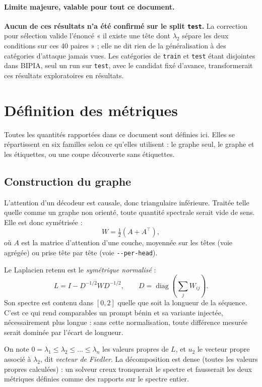 \documentclass[11pt,a4paper]{article}
\begin{document}
\paragraph{Limite majeure, valable pour tout ce document.} \textbf{Aucun de ces
résultats n'a été confirmé sur le split \texttt{test}.} La correction pour
sélection valide l'énoncé « il existe une tête dont $\lambda_2$ sépare les deux
conditions sur ces 40 paires » ; elle ne dit rien de la généralisation à des
catégories d'attaque jamais vues. Les catégories de \texttt{train} et
\texttt{test} étant disjointes dans BIPIA, seul un run sur \texttt{test}, avec
le candidat fixé d'avance, transformerait ces résultats exploratoires en
résultats.

\section{Définition des métriques}
\label{sec:metriques}

Toutes les quantités rapportées dans ce document sont définies ici. Elles se
répartissent en six familles selon ce qu'elles utilisent : le graphe seul, le
graphe et les étiquettes, ou une coupe découverte sans étiquettes.

\subsection{Construction du graphe}

L'attention d'un décodeur est causale, donc triangulaire inférieure. Traitée
telle quelle comme un graphe non orienté, toute quantité spectrale serait vide
de sens. Elle est donc symétrisée :
\[
  W = \tfrac{1}{2}\left(A + A^{\top}\right),
\]
où $A$ est la matrice d'attention d'une couche, moyennée sur les têtes
(voie agrégée) ou prise tête par tête (voie \texttt{-{}-per-head}).

Le Laplacien retenu est le \emph{symétrique normalisé} :
\[
  L = I - D^{-1/2} W D^{-1/2},
  \qquad D = \operatorname{diag}\!\left(\textstyle\sum_j W_{ij}\right).
\]
Son spectre est contenu dans $[0, 2]$ quelle que soit la longueur de la
séquence. C'est ce qui rend comparables un prompt bénin et sa variante
injectée, nécessairement plus longue : sans cette normalisation, toute
différence mesurée serait dominée par l'écart de longueur.

On note $0 = \lambda_1 \le \lambda_2 \le \dots \le \lambda_n$ les valeurs
propres de $L$, et $u_2$ le vecteur propre associé à $\lambda_2$, dit
\emph{vecteur de Fiedler}. La décomposition est dense (toutes les valeurs
propres calculées) : un solveur creux tronquerait le spectre et fausserait les
deux métriques définies comme des rapports sur le spectre entier.
\end{document}
